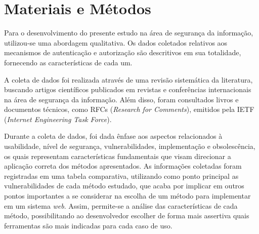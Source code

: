 \section{Materiais e Métodos}

Para o desenvolvimento do presente estudo na área de segurança da informação,  utilizou-se uma 
abordagem qualitativa. Os dados coletados relativos aos mecanismos de autenticação e autorização 
são descritivos em sua totalidade, fornecendo as características de cada um.

A coleta de dados foi realizada através de uma revisão sistemática da literatura, buscando artigos 
científicos publicados em revistas e conferências internacionais na área de segurança da informação.
Além disso, foram consultados livros e documentos técnicos, como RFCs 
(\emph{Research for Comments}), emitidos pela IETF (\emph{Internet Engineering Task Force}).

Durante a coleta de dados, foi dada ênfase aos aspectos relacionados à usabilidade, nível de 
segurança, vulnerabilidades, implementação e obsolescência, os quais representam características 
fundamentais que visam direcionar a aplicação correta dos métodos apresentados. As informações 
coletadas foram registradas em uma tabela comparativa, utilizando como ponto principal as 
vulnerabilidades de cada método estudado, que acaba por implicar em outros pontos importantes a se 
considerar na escolha de um método para implementar em um sistema \emph{web}. Assim, permite-se a 
análise das características de cada método, possibilitando ao desenvolvedor escolher de forma mais 
assertiva quais ferramentas são mais indicadas para cada caso de uso.





